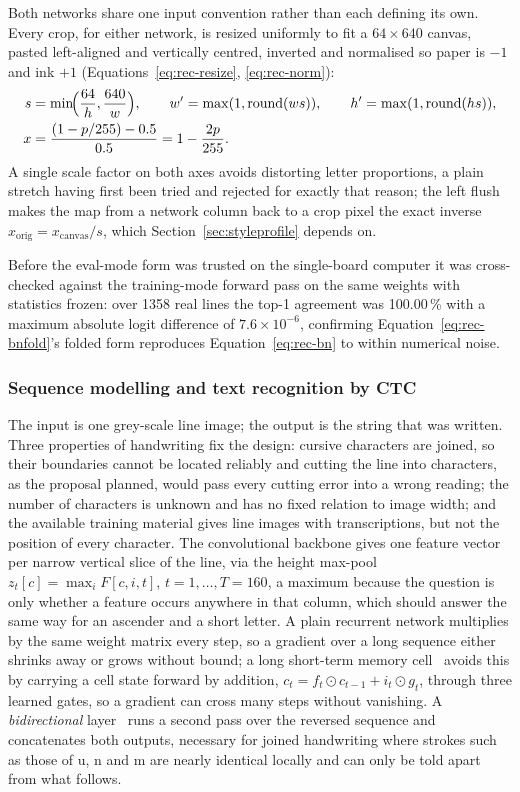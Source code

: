 Both networks share one input convention rather than each defining its own. Every crop, for either network, is resized uniformly to fit a $64\times640$ canvas, pasted left-aligned and vertically centred, inverted and normalised so paper is $-1$ and ink $+1$ (Equations~\ref{eq:rec-resize}, \ref{eq:rec-norm}):
\begin{align}
s&=\min\!\Bigl(\frac{64}{h},\frac{640}{w}\Bigr),\qquad w'=\max(1,\mathrm{round}(ws)),\qquad h'=\max(1,\mathrm{round}(hs)),\label{eq:rec-resize}\\
x&=\frac{(1-p/255)-0.5}{0.5}=1-\frac{2p}{255}.\label{eq:rec-norm}
\end{align}
A single scale factor on both axes avoids distorting letter proportions, a plain stretch having first been tried and rejected for exactly that reason; the left flush makes the map from a network column back to a crop pixel the exact inverse $x_{\mathrm{orig}}=x_{\mathrm{canvas}}/s$, which Section~\ref{sec:styleprofile} depends on.

Before the eval-mode form was trusted on the single-board computer it was cross-checked against the training-mode forward pass on the same weights with statistics frozen: over 1358 real lines the top-1 agreement was 100.00\,\% with a maximum absolute logit difference of $7.6\times10^{-6}$, confirming Equation~\ref{eq:rec-bnfold}'s folded form reproduces Equation~\ref{eq:rec-bn} to within numerical noise.

\subsubsection{Sequence modelling and text recognition by CTC}
\label{sec:rec-ctc}

The input is one grey-scale line image; the output is the string that was written. Three properties of handwriting fix the design: cursive characters are joined, so their boundaries cannot be located reliably and cutting the line into characters, as the proposal planned, would pass every cutting error into a wrong reading; the number of characters is unknown and has no fixed relation to image width; and the available training material gives line images with transcriptions, but not the position of every character. The convolutional backbone gives one feature vector per narrow vertical slice of the line, via the height max-pool $z_t[c]=\max_iF[c,i,t]$, $t=1,\ldots,T=160$, a maximum because the question is only whether a feature occurs anywhere in that column, which should answer the same way for an ascender and a short letter. A plain recurrent network multiplies by the same weight matrix every step, so a gradient over a long sequence either shrinks away or grows without bound; a long short-term memory cell~\cite{hochreiter1997} avoids this by carrying a cell state forward by addition, $c_t=f_t\odot c_{t-1}+i_t\odot g_t$, through three learned gates, so a gradient can cross many steps without vanishing. A \emph{bidirectional} layer~\cite{schuster1997} runs a second pass over the reversed sequence and concatenates both outputs, necessary for joined handwriting where strokes such as those of u, n and m are nearly identical locally and can only be told apart from what follows.

